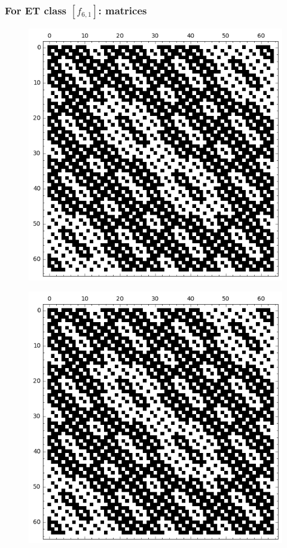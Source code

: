 \documentclass[pdf,sprung,slideColor,nocolorBG]{beamer}
\begin{document}
\begin{frame}
\frametitle{For ET class $[f_{6,1}]$: matrices}
\begin{figure}
\centering
\begin{minipage}{.48\textwidth}
  \centering
  \includegraphics[width=.9\linewidth]{../matrix_plot/c6_1_weight_class_matrix.png}
  \label{fig:6_1_weight_class_matrix}
\end{minipage}%
\begin{minipage}{.48\textwidth}
  \centering
  \includegraphics[width=.9\linewidth]{../matrix_plot/c6_1_bent_cayley_graph_index_matrix.png}

\end{minipage}
\end{figure}
\end{frame}
\end{document}
